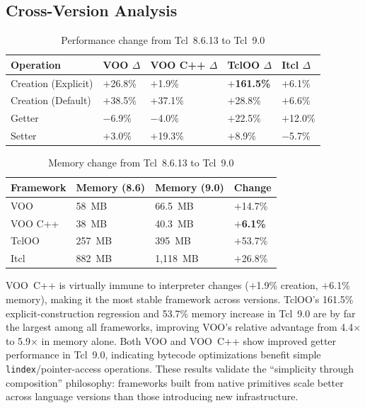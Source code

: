\subsection{Cross-Version Analysis}

\begin{table}[H]
\centering
\caption{Performance change from Tcl~8.6.13 to Tcl~9.0}
\begin{tabular}{lllll}
\toprule
\textbf{Operation} & \textbf{VOO $\Delta$} & \textbf{VOO C++ $\Delta$} & \textbf{TclOO $\Delta$} & \textbf{Itcl $\Delta$} \\
\midrule
Creation (Explicit) & $+$26.8\% & $+$1.9\% & \textbf{$+$161.5\%} & $+$6.1\% \\
Creation (Default)  & $+$38.5\% & $+$37.1\% & $+$28.8\%           & $+$6.6\% \\
Getter              & $-$6.9\%  & $-$4.0\%  & $+$22.5\%           & $+$12.0\% \\
Setter              & $+$3.0\%  & $+$19.3\% & $+$8.9\%            & $-$5.7\% \\
\bottomrule
\end{tabular}
\end{table}

\begin{table}[H]
\centering
\caption{Memory change from Tcl~8.6.13 to Tcl~9.0}
\begin{tabular}{llll}
\toprule
\textbf{Framework} & \textbf{Memory (8.6)} & \textbf{Memory (9.0)} & \textbf{Change} \\
\midrule
VOO       & 58~MB    & 66.5~MB   & $+$14.7\% \\
VOO C++   & 38~MB    & 40.3~MB   & \textbf{$+$6.1\%} \\
TclOO     & 257~MB   & 395~MB    & $+$53.7\% \\
Itcl      & 882~MB   & 1,118~MB  & $+$26.8\% \\
\bottomrule
\end{tabular}
\end{table}

VOO~C++ is virtually immune to interpreter changes ($+$1.9\% creation, $+$6.1\% memory),
making it the most stable framework across versions. TclOO's 161.5\% explicit-construction
regression and 53.7\% memory increase in Tcl~9.0 are by far the largest among all
frameworks, improving VOO's relative advantage from 4.4$\times$ to 5.9$\times$ in memory
alone. Both VOO and VOO~C++ show improved getter performance in Tcl~9.0, indicating
bytecode optimizations benefit simple \texttt{lindex}/pointer-access operations. These
results validate the ``simplicity through composition'' philosophy: frameworks built from
native primitives scale better across language versions than those introducing new
infrastructure.
